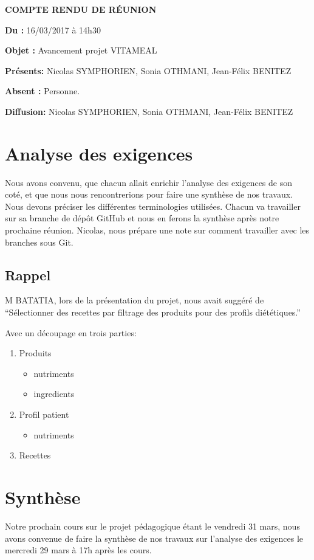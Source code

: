 \documentclass[11pt,a4paper,french,twoside,openright]{article}
\begin{document}
\pagestyle{fancy}

\begin{center}\bfseries\Huge
COMPTE RENDU DE RÉUNION
\end{center}

\textbf{Du      :} 16/03/2017 à 14h30

\textbf{Objet   :} Avancement projet VITAMEAL

\textbf{Présents:} Nicolas SYMPHORIEN, Sonia OTHMANI, Jean-Félix BENITEZ

\textbf{Absent :} Personne.

\textbf{Diffusion:} Nicolas SYMPHORIEN, Sonia OTHMANI, Jean-Félix BENITEZ

\hrulefill

\section{Analyse des exigences}
Nous avons convenu, que chacun allait enrichir l'analyse des exigences de son coté, et que nous nous rencontrerions pour faire une synthèse de nos travaux. Nous devons préciser les différentes terminologies utilisées. Chacun va travailler sur sa branche de dépôt GitHub et nous en ferons la synthèse après notre prochaine réunion.
Nicolas, nous prépare une note sur comment travailler avec les branches sous Git.
\subsection{Rappel}
M BATATIA, lors de la présentation du projet, nous avait suggéré de \enquote{Sélectionner des recettes par filtrage des produits pour des profils diététiques.}

Avec un découpage en trois parties:
\begin{enumerate}
\item Produits
  \begin{itemize}
    \item nutriments
    \item ingredients
  \end{itemize}
\item Profil patient
  \begin{itemize}
    \item nutriments
  \end{itemize}
\item Recettes
\end{enumerate}

\section{Synthèse}
Notre prochain cours sur le projet pédagogique étant le vendredi 31 mars, nous avons convenue de faire la synthèse de nos travaux sur l'analyse des exigences le mercredi 29 mars à 17h après les cours.

\label{LastPage}
\end{document}
